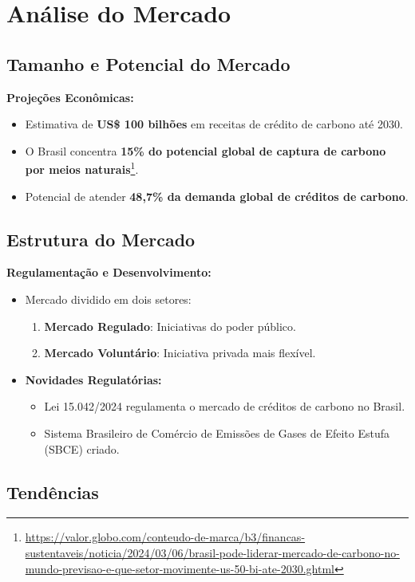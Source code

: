 \documentclass[a4paper,12pt]{article}
\begin{document}
\section{Análise do Mercado}

\subsection{Tamanho e Potencial do Mercado}

\textbf{Projeções Econômicas:}
\begin{itemize}
    \item Estimativa de \textbf{US\$ 100 bilhões} em receitas de crédito de carbono até 2030.
    \item O Brasil concentra \textbf{15\% do potencial global de captura de carbono por meios naturais}\footnote{\url{https://valor.globo.com/conteudo-de-marca/b3/financas-sustentaveis/noticia/2024/03/06/brasil-pode-liderar-mercado-de-carbono-no-mundo-previsao-e-que-setor-movimente-us-50-bi-ate-2030.ghtml}}.
    \item Potencial de atender \textbf{48,7\% da demanda global de créditos de carbono}.
\end{itemize}

\subsection{Estrutura do Mercado}

\textbf{Regulamentação e Desenvolvimento:}
\begin{itemize}
    \item Mercado dividido em dois setores:
    \begin{enumerate}
        \item \textbf{Mercado Regulado}: Iniciativas do poder público.
        \item \textbf{Mercado Voluntário}: Iniciativa privada mais flexível.
    \end{enumerate}
    \item \textbf{Novidades Regulatórias:}
    \begin{itemize}
        \item Lei 15.042/2024 regulamenta o mercado de créditos de carbono no Brasil.
        \item Sistema Brasileiro de Comércio de Emissões de Gases de Efeito Estufa (SBCE) criado.
    \end{itemize}
\end{itemize}

\subsection{Tendências}
\end{document}
